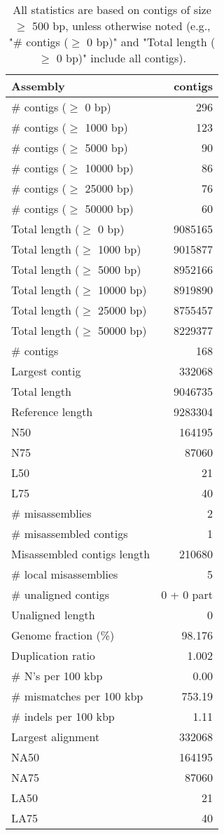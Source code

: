 \documentclass[12pt,a4paper]{article}
\begin{document}
\begin{table}[ht]
\begin{center}
\caption{All statistics are based on contigs of size $\geq$ 500 bp, unless otherwise noted (e.g., "\# contigs ($\geq$ 0 bp)" and "Total length ($\geq$ 0 bp)" include all contigs).}
\begin{tabular}{|l*{1}{|r}|}
\hline
Assembly & contigs \\ \hline
\# contigs ($\geq$ 0 bp) & 296 \\ \hline
\# contigs ($\geq$ 1000 bp) & 123 \\ \hline
\# contigs ($\geq$ 5000 bp) & 90 \\ \hline
\# contigs ($\geq$ 10000 bp) & 86 \\ \hline
\# contigs ($\geq$ 25000 bp) & 76 \\ \hline
\# contigs ($\geq$ 50000 bp) & 60 \\ \hline
Total length ($\geq$ 0 bp) & 9085165 \\ \hline
Total length ($\geq$ 1000 bp) & 9015877 \\ \hline
Total length ($\geq$ 5000 bp) & 8952166 \\ \hline
Total length ($\geq$ 10000 bp) & 8919890 \\ \hline
Total length ($\geq$ 25000 bp) & 8755457 \\ \hline
Total length ($\geq$ 50000 bp) & 8229377 \\ \hline
\# contigs & 168 \\ \hline
Largest contig & 332068 \\ \hline
Total length & 9046735 \\ \hline
Reference length & 9283304 \\ \hline
N50 & 164195 \\ \hline
N75 & 87060 \\ \hline
L50 & 21 \\ \hline
L75 & 40 \\ \hline
\# misassemblies & 2 \\ \hline
\# misassembled contigs & 1 \\ \hline
Misassembled contigs length & 210680 \\ \hline
\# local misassemblies & 5 \\ \hline
\# unaligned contigs & 0 + 0 part \\ \hline
Unaligned length & 0 \\ \hline
Genome fraction (\%) & 98.176 \\ \hline
Duplication ratio & 1.002 \\ \hline
\# N's per 100 kbp & 0.00 \\ \hline
\# mismatches per 100 kbp & 753.19 \\ \hline
\# indels per 100 kbp & 1.11 \\ \hline
Largest alignment & 332068 \\ \hline
NA50 & 164195 \\ \hline
NA75 & 87060 \\ \hline
LA50 & 21 \\ \hline
LA75 & 40 \\ \hline
\end{tabular}
\end{center}
\end{table}
\end{document}

